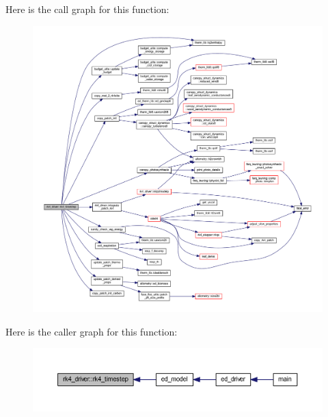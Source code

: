 Here is the call graph for this function\+:\nopagebreak
\begin{figure}[H]
\begin{center}
\leavevmode
\includegraphics[width=350pt]{namespacerk4__driver_abf8bd20405c7ed6a7bab3bdb18d8de87_cgraph}
\end{center}
\end{figure}




Here is the caller graph for this function\+:\nopagebreak
\begin{figure}[H]
\begin{center}
\leavevmode
\includegraphics[width=350pt]{namespacerk4__driver_abf8bd20405c7ed6a7bab3bdb18d8de87_icgraph}
\end{center}
\end{figure}


